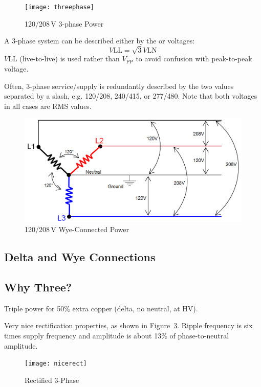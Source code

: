 \documentclass[11pt]{article}
\newlength\onewide
\begin{document}
\begin{figure}[ht]
  \centering
  \texttt{[image: threephase]}
  \caption{120/208\,\unit{V} 3-phase Power}
  \label{fig:threephase}
\end{figure}

A 3-phase system can be described either by the
 or  voltages:
\[
V\mathrm{LL} = \sqrt{3}V\mathrm{LN}
\]
$V\mathrm{LL}$ (live-to-live) is used rather than $V_\mathrm{PP}$ to
avoid confusion with peak-to-peak voltage.
 
Often, 3-phase service/supply is redundantly described by the two
values separated by a slash, e.g. 120/208, 240/415, or 277/480. Note
that both voltages in all cases are RMS values.

\begin{figure}[ht]
  \centering
  \includegraphics[width=\onewide]{wyevoltages}
  \caption{120/208\,\unit{V} Wye-Connected Power}
  \label{fig:wyevoltages}
\end{figure}

\subsection{Delta and Wye Connections}

\subsection{Why Three?}

Triple power for 50\% extra copper (delta, no neutral, at HV).

Very nice rectification properties, as shown in
Figure~\ref{fig:nicerect}. Ripple frequency is six times supply
frequency and amplitude is about 13\% of phase-to-neutral amplitude.

\begin{figure}[ht]
  \centering
  \texttt{[image: nicerect]}
  \caption{Rectified 3-Phase}
  \label{fig:nicerect}
\end{figure}
\end{document}
